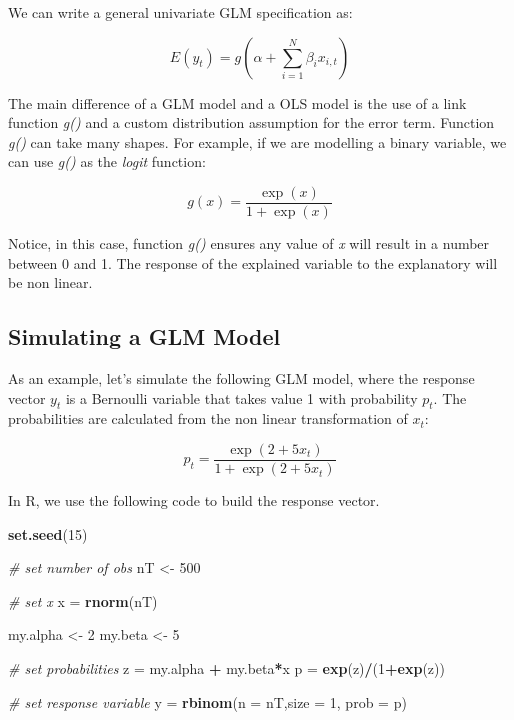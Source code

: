 \documentclass[11pt,]{book}
\newenvironment{Shaded}{\begin{snugshade}}{\end{snugshade}}
\newcommand{\KeywordTok}[1]{\textcolor[rgb]{0.27,0.27,0.27}{\textbf{#1}}}
\newcommand{\DataTypeTok}[1]{\textcolor[rgb]{0.27,0.27,0.27}{#1}}
\newcommand{\DecValTok}[1]{\textcolor[rgb]{0.06,0.06,0.06}{#1}}
\newcommand{\StringTok}[1]{\textcolor[rgb]{0.5,0.5,0.5}{#1}}
\newcommand{\CommentTok}[1]{\textcolor[rgb]{0.56,0.35,0.01}{\textit{#1}}}
\newcommand{\OperatorTok}[1]{\textcolor[rgb]{0.81,0.36,0.00}{\textbf{#1}}}
\newcommand{\NormalTok}[1]{#1}
\begin{document}
We can write a general univariate GLM specification as:

\[ E \left( y _t \right) = g \left(\alpha + \sum ^N _{i=1} \beta _i x_{i,t}  \right)\]

The main difference of a GLM model and a OLS model is the use of a link
function \emph{g()} and a custom distribution assumption for the error
term. Function \emph{g()} can take many shapes. For example, if we are
modelling a binary variable, we can use \emph{g()} as the \emph{logit}
function:

\[ g(x) = \frac{\exp(x)}{1+\exp(x)} \]

Notice, in this case, function \emph{g()} ensures any value of \emph{x}
will result in a number between 0 and 1. The response of the explained
variable to the explanatory will be non linear.

\subsection{Simulating a GLM Model}\label{simulating-a-glm-model}

As an example, let's simulate the following GLM model, where the
response vector \(y_t\) is a Bernoulli variable that takes value 1 with
probability \(p_t\). The probabilities are calculated from the non
linear transformation of \(x_t\):

\[ p _t  = \frac{\exp(2+5x_t)}{1+\exp(2+5x_t)}  \]

In R, we use the following code to build the response vector.

\begin{Shaded}
\begin{Highlighting}[]
\KeywordTok{set.seed}\NormalTok{(}\DecValTok{15}\NormalTok{)}

\CommentTok{# set number of obs}
\NormalTok{nT <-}\StringTok{ }\DecValTok{500}

\CommentTok{# set x}
\NormalTok{x =}\StringTok{ }\KeywordTok{rnorm}\NormalTok{(nT)}

\NormalTok{my.alpha <-}\StringTok{ }\DecValTok{2}
\NormalTok{my.beta <-}\StringTok{ }\DecValTok{5}

\CommentTok{# set probabilities}
\NormalTok{z =}\StringTok{ }\NormalTok{my.alpha }\OperatorTok{+}\StringTok{ }\NormalTok{my.beta}\OperatorTok{*}\NormalTok{x}
\NormalTok{p =}\StringTok{ }\KeywordTok{exp}\NormalTok{(z)}\OperatorTok{/}\NormalTok{(}\DecValTok{1}\OperatorTok{+}\KeywordTok{exp}\NormalTok{(z))}

\CommentTok{# set response variable}
\NormalTok{y =}\StringTok{ }\KeywordTok{rbinom}\NormalTok{(}\DataTypeTok{n =}\NormalTok{ nT,}\DataTypeTok{size =} \DecValTok{1}\NormalTok{, }\DataTypeTok{prob =}\NormalTok{ p)}
\end{Highlighting}
\end{Shaded}
\end{document}
